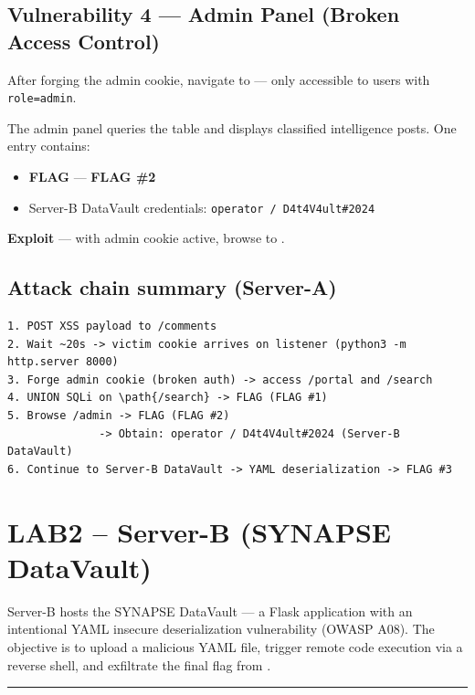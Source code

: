 \subsection{Vulnerability 4 --- Admin Panel (Broken Access Control)}

After forging the admin cookie, navigate to  --- only accessible to users with \texttt{role=admin}.

The admin panel queries the  table and displays classified intelligence posts. One entry contains:

\begin{itemize}
\tightlist
\item
  \textbf{FLAG} --- \textbf{FLAG \#2}
\item
  Server-B DataVault credentials: \texttt{operator\ /\ D4t4V4ult\#2024}
\end{itemize}

\textbf{Exploit} --- with admin cookie active, browse to .

\subsection{Attack chain summary (Server-A)}

\begin{lstlisting}
1. POST XSS payload to /comments
2. Wait ~20s -> victim cookie arrives on listener (python3 -m http.server 8000)
3. Forge admin cookie (broken auth) -> access /portal and /search
4. UNION SQLi on \path{/search} -> FLAG (FLAG #1)
5. Browse /admin -> FLAG (FLAG #2)
              -> Obtain: operator / D4t4V4ult#2024 (Server-B DataVault)
6. Continue to Server-B DataVault -> YAML deserialization -> FLAG #3
\end{lstlisting}

\section{LAB2 -- Server-B (SYNAPSE DataVault)}

Server-B hosts the SYNAPSE DataVault --- a Flask application with an intentional YAML insecure deserialization vulnerability (OWASP A08). The objective is to upload a malicious YAML file, trigger remote code execution via a reverse shell, and exfiltrate the final flag from .

\begin{center}\rule{0.5\linewidth}{0.5pt}\end{center}

